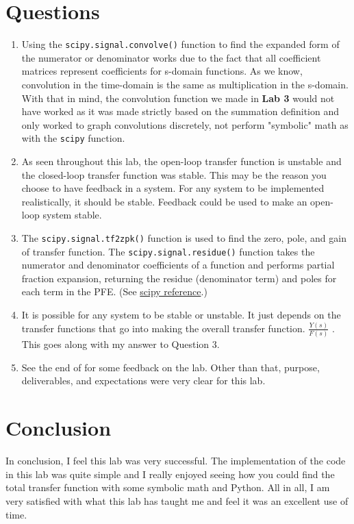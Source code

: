 \documentclass[12pt]{report}
\begin{document}
\section{Questions}
\begin{enumerate}
  \item Using the \texttt{scipy.signal.convolve()} function to find the expanded form of the numerator or denominator works due to the fact that all coefficient 
  matrices represent coefficients for s-domain functions. As we know, convolution in the time-domain is the same as multiplication in the s-domain. With that in 
  mind, the convolution function we made in \textbf{Lab 3} would not have worked as it was made strictly based on the summation definition and only worked to graph
  convolutions discretely, not perform "symbolic" math as with the \texttt{scipy} function.
  \item As seen throughout this lab, the open-loop transfer function is unstable and the closed-loop transfer function was stable. This may be the reason you choose
  to have feedback in a system. For any system to be implemented realistically, it should be stable. Feedback could be used to make an open-loop system stable.
  \item The \texttt{scipy.signal.tf2zpk()} function is used to find the zero, pole, and gain of transfer function. The \texttt{scipy.signal.residue()} function takes
  the numerator and denominator coefficients of a function and performs partial fraction expansion, returning
  the residue (denominator term) and poles for each term in the PFE. (See \href{https://docs.scipy.org/doc/scipy/reference/}{scipy reference}.)
  \item It is possible for any system to be stable or unstable. It just depends on the transfer functions that go into making the overall transfer function. 
 \(\frac{Y(s)}{F(s)}\) . This goes along with my answer to Question 3.
  \item See the end of  for some feedback on the lab. Other than that, purpose, deliverables, and expectations were very clear for this lab.
\end{enumerate}
\section{Conclusion}
In conclusion, I feel this lab was very successful. The implementation of the code in this lab was quite simple and I really enjoyed seeing how you could
find the total transfer function with some symbolic math and Python. All in all, I am very satisfied with what this lab has taught me and feel it was an 
excellent use of time.
\newpage
\thispagestyle{customblank}
\end{document}
